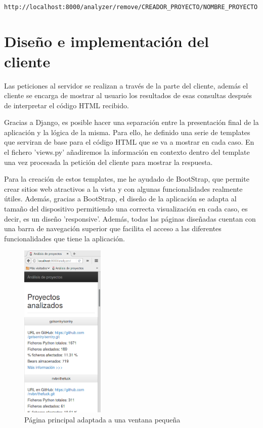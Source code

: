 \documentclass[a4paper, 12pt]{book}
\begin{document}
{\footnotesize
\begin{verbatim}
    http://localhost:8000/analyzer/remove/CREADOR_PROYECTO/NOMBRE_PROYECTO
\end{verbatim}
}

\section{Diseño e implementación del cliente} 
\label{sec:seccion13}
Las peticiones al servidor se realizan a través de la parte del cliente, además el cliente se encarga de mostrar al usuario los resultados de esas consultas después de interpretar el código HTML recibido.

Gracias a Django, es posible hacer una separación entre la presentación final de la aplicación y la lógica de la misma. Para ello, he definido una serie de templates que serviran de base para el código HTML que se va a mostrar en cada caso. En el fichero 'views.py' añadiremos la información en contexto dentro del template una vez procesada la petición del cliente para mostrar la respuesta.

Para la creación de estos templates, me he ayudado de BootStrap, que permite crear sitios web atractivos a la vista y con algunas funcionalidades realmente útiles. Además, gracias a BootStrap, el diseño de la aplicación se adapta al tamaño del dispositivo permitiendo una correcta visualización en cada caso, es decir, es un diseño 'responsive'. Además, todas las páginas diseñadas cuentan con una barra de navegación superior que facilita el acceso a las diferentes funcionalidades que tiene la aplicación.

\begin{figure}[H]
  \centering
  \includegraphics[width=4cm, keepaspectratio]{img/webAdaptativa}
  \caption{Página principal adaptada a una ventana pequeña}
  \label{fig:webAdaptativa}
\end{figure}
\end{document}
